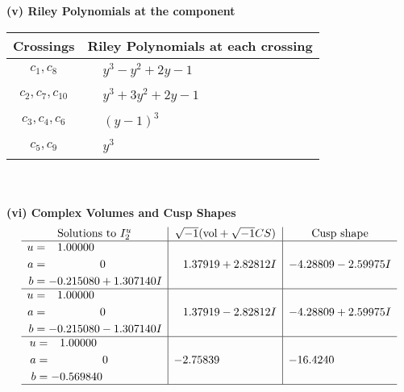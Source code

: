\documentclass[1p]{elsarticle_modified}
\theoremstyle{definition}
\newcommand{\I}{\sqrt{-1}}
\begin{document}
\newpage\renewcommand{\arraystretch}{1}
\flushleft \textbf{(v) Riley Polynomials at the component}\newline \\
\begin{tabular}{m{50pt}|m{274pt}}
Crossings & \hspace{64pt}Riley Polynomials at each crossing \\
\hline $$\begin{aligned}c_{1},c_{8}\end{aligned}$$&$\begin{aligned}
&y^3- y^2+2 y-1
\end{aligned}$\\
\hline $$\begin{aligned}c_{2},c_{7},c_{10}\end{aligned}$$&$\begin{aligned}
&y^3+3 y^2+2 y-1
\end{aligned}$\\
\hline $$\begin{aligned}c_{3},c_{4},c_{6}\end{aligned}$$&$\begin{aligned}
&(y-1)^3
\end{aligned}$\\
\hline $$\begin{aligned}c_{5},c_{9}\end{aligned}$$&$\begin{aligned}
&y^3
\end{aligned}$\\
\hline
\end{tabular}\\~\\
\newpage\flushleft \textbf{(vi) Complex Volumes and Cusp Shapes}
$$\begin{array}{c|c|c}  
\text{Solutions to }I^u_{2}& \I (\text{vol} + \sqrt{-1}CS) & \text{Cusp shape}\\
 \hline 
\begin{aligned}
u &= \phantom{-}1.00000\phantom{ +0.000000I} \\
a &= \phantom{-0.000000 } 0 \\
b &= -0.215080 + 1.307140 I\end{aligned}
 & \phantom{-}1.37919 + 2.82812 I & -4.28809 - 2.59975 I \\ \hline\begin{aligned}
u &= \phantom{-}1.00000\phantom{ +0.000000I} \\
a &= \phantom{-0.000000 } 0 \\
b &= -0.215080 - 1.307140 I\end{aligned}
 & \phantom{-}1.37919 - 2.82812 I & -4.28809 + 2.59975 I \\ \hline\begin{aligned}
u &= \phantom{-}1.00000\phantom{ +0.000000I} \\
a &= \phantom{-0.000000 } 0 \\
b &= -0.569840\phantom{ +0.000000I}\end{aligned}
 & -2.75839\phantom{ +0.000000I} & -16.4240\phantom{ +0.000000I}\\
 \hline 
 \end{array}$$\newpage
\end{document}
